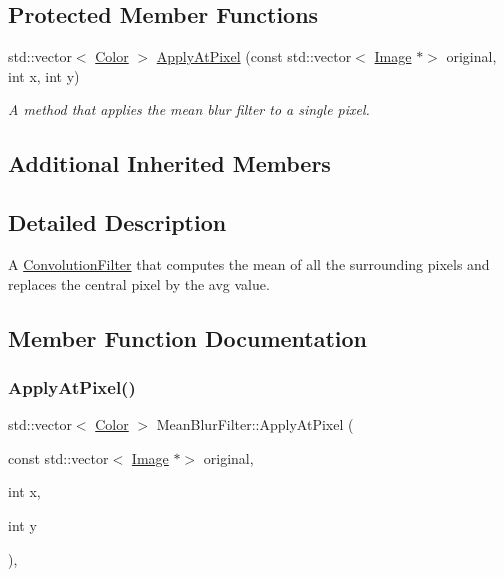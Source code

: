 \subsection*{Protected Member Functions}
\begin{DoxyCompactItemize}
\item 
std\+::vector$<$ \hyperlink{classColor}{Color} $>$ \hyperlink{classMeanBlurFilter_a59f554dae7213e726db9235979eef86b}{Apply\+At\+Pixel} (const std\+::vector$<$ \hyperlink{classImage}{Image} $\ast$$>$ original, int x, int y)
\begin{DoxyCompactList}\small\item\em A method that applies the mean blur filter to a single pixel. \end{DoxyCompactList}\end{DoxyCompactItemize}
\subsection*{Additional Inherited Members}


\subsection{Detailed Description}
A \hyperlink{classConvolutionFilter}{Convolution\+Filter} that computes the mean of all the surrounding pixels and replaces the central pixel by the avg value. 

\subsection{Member Function Documentation}
\mbox{\label{classMeanBlurFilter_a59f554dae7213e726db9235979eef86b}} 
\subsubsection{\texorpdfstring{Apply\+At\+Pixel()}{ApplyAtPixel()}}
{\footnotesize\ttfamily std\+::vector$<$ \hyperlink{classColor}{Color} $>$ Mean\+Blur\+Filter\+::\+Apply\+At\+Pixel (\begin{DoxyParamCaption}\item[{const std\+::vector$<$ \hyperlink{classImage}{Image} $\ast$$>$}]{original,  }\item[{int}]{x,  }\item[{int}]{y }\end{DoxyParamCaption})\hspace{0.3cm}{\ttfamily [protected]}, {\ttfamily [virtual]}}



